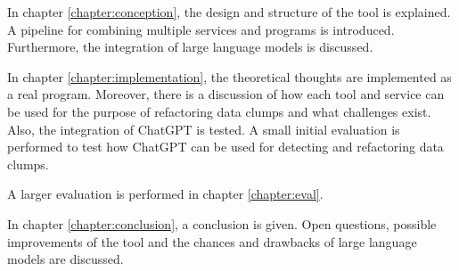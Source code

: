In chapter \ref{chapter:conception}, the design and structure of the tool is explained. A pipeline for combining multiple services and programs is introduced. Furthermore, the integration of large language models is discussed. 

In chapter \ref{chapter:implementation}, the theoretical thoughts are implemented as a real program. Moreover, there is a discussion of how each tool and service can be used for the purpose of refactoring data clumps and what challenges exist. Also, the integration of ChatGPT is tested. A small initial evaluation is performed to test how ChatGPT can be used for detecting and refactoring data clumps. 

A larger evaluation is performed in chapter \ref{chapter:eval}.

In chapter \ref{chapter:conclusion}, a conclusion is given. Open questions, possible improvements of the tool and the chances and drawbacks of large language models are discussed.
